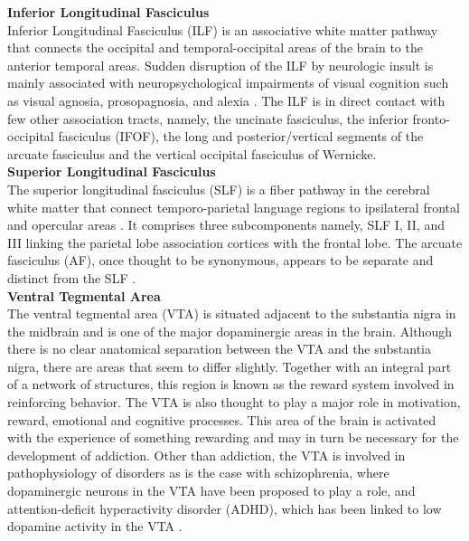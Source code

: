 \documentclass[../structure.tex]{subfiles}
\begin{document}
				
		\textbf{Inferior Longitudinal Fasciculus}\\		
		Inferior Longitudinal Fasciculus (ILF) is an associative white matter pathway that connects the occipital and temporal-occipital areas of the brain to the anterior temporal areas.  Sudden disruption of the ILF by neurologic insult is mainly associated with  neuropsychological impairments of visual cognition such as visual agnosia, prosopagnosia, and alexia \cite{Herbet_2018}. The ILF is in direct contact with few other association tracts, namely, the uncinate fasciculus, the inferior fronto-occipital fasciculus (IFOF), the long and posterior/vertical segments of the arcuate fasciculus and the vertical occipital fasciculus of Wernicke.\\

		

		\textbf{Superior Longitudinal Fasciculus}\\			
		The superior longitudinal fasciculus (SLF) is a fiber pathway in the cerebral white matter that connect temporo-parietal language regions to ipsilateral frontal and opercular areas \cite{Madhavan_2014}. It comprises three subcomponents namely, SLF I, II, and III linking the parietal lobe association cortices with the frontal lobe. The arcuate fasciculus (AF), once thought to be synonymous, appears to be separate and distinct from the SLF \cite{Schmahmann2006}.\\
		
		
		\textbf{Ventral Tegmental Area}\\
		The ventral tegmental area (VTA) is situated adjacent to the substantia nigra in the midbrain and is one of the major dopaminergic areas in the brain. Although there is no clear anatomical separation between the VTA and the substantia nigra, there are areas that seem to differ slightly. Together with an integral part of a network of structures, this region is known as the reward system involved in reinforcing behavior. The VTA is also thought to play a major role in motivation, reward, emotional and cognitive processes. This area of the brain is activated with the experience of something rewarding and may in turn be necessary for the development of addiction. Other than addiction, the VTA is involved in pathophysiology of disorders as is the case with schizophrenia, where dopaminergic neurons in the VTA have been proposed to play a role, and attention-deficit hyperactivity disorder (ADHD), which has been linked to low dopamine activity in the VTA \cite{Kalivas1993}.\\
	
\end{document}
